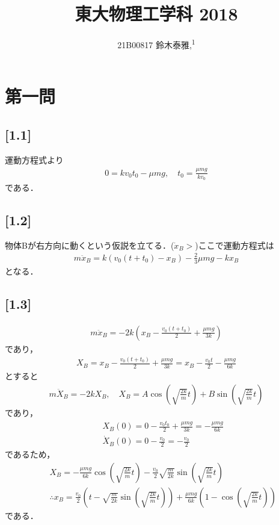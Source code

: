 \documentclass[12pt,dvipdfmx]{jsarticle}
\newcommand\authormark[1]{\textsuperscript{#1}}
\begin{document}
\title{東大物理工学科 2018}

\author{21B00817 鈴木泰雅,\authormark{1}}
\section*{\Large{第一問}}
\subsection*{\large{[1.1]}}
運動方程式より
\begin{eqnarray}
  0 = kv_0t_0 -\mu mg, \quad t_0 = \frac{\mu mg}{kv_0}
\end{eqnarray}
である．
\subsection*{\large{[1.2]}}
物体Bが右方向に動くという仮説を立てる．($\dot{x}_B>$)ここで運動方程式は
\begin{eqnarray}
  m\ddot{x}_B = k(v_0(t+t_0)-x_B)-\frac{2}{3}\mu mg -k x_B
\end{eqnarray}
となる．
\subsection*{\large{[1.3]}}
\begin{eqnarray}
  m\ddot{x}_B = -2k \left( x_B -\frac{v_0 (t+t_0)}{2}+ \frac{\mu mg}{3k} \right)
\end{eqnarray}
であり，
\begin{eqnarray}
  X_B =  x_B -\frac{v_0 (t+t_0)}{2}+ \frac{\mu mg}{3k} = x_B -\frac{v_0 t}{2} -\frac{\mu mg}{6k}
\end{eqnarray}
とすると
\begin{eqnarray}
  m\ddot{X}_B = -2k X_B,\quad X_B = A\cos\left( \sqrt{\frac{2k}{m}}t \right) + B\sin\left( \sqrt{\frac{2k}{m}}t \right)
\end{eqnarray}
であり，
\begin{eqnarray}
  &&X_B(0)= 0 - \frac{v_0 t_0}{2} + \frac{\mu mg}{3k}= -\frac{\mu mg}{6k}\\
  &&\dot{X}_B(0) = 0 -\frac{v_0}{2} = -\frac{v_0}{2}
\end{eqnarray}
であるため，
\begin{eqnarray}
  &&X_B = -\frac{\mu mg}{6k}\cos\left( \sqrt{\frac{2k}{m}}t \right) -\frac{v_0}{2}\sqrt{\frac{m}{2k}}\sin\left( \sqrt{\frac{2k}{m}}t \right)\\
  &&\therefore x_B = \frac{v_0}{2}\left( t-\sqrt{\frac{m}{2k}}\sin\left( \sqrt{\frac{2k}{m}}t \right) \right) + \frac{\mu mg}{6k}\left( 1- \cos\left( \sqrt{\frac{2k}{m}}t \right)\right)
\end{eqnarray}
である．
\end{document}
